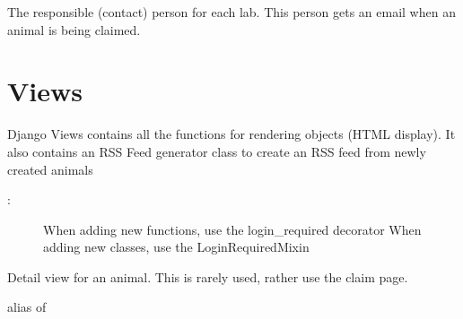 \documentclass[letterpaper,10pt,openany,oneside,english]{sphinxmanual}
\begin{document}
\begin{fulllineitems}
\label{\detokenize{index:animals.models.Person}}
The responsible (contact) person for each lab.
This person gets an email when an animal is being claimed.

\begin{fulllineitems}
\label{\detokenize{index:animals.models.Person.DoesNotExist}}
\end{fulllineitems}


\begin{fulllineitems}
\label{\detokenize{index:animals.models.Person.MultipleObjectsReturned}}
\end{fulllineitems}


\end{fulllineitems}



\section{Views}
\label{\detokenize{index:module-animals.views}}\label{\detokenize{index:views}}
Django Views contains all the functions for rendering objects (HTML display).
It also contains an RSS Feed generator class to create an RSS feed from newly created animals
\begin{description}
\item[{:}] \leavevmode
When adding new functions, use the login\_required decorator
When adding new classes, use the LoginRequiredMixin

\end{description}

\begin{fulllineitems}
\label{\detokenize{index:animals.views.AnimalDetailView}}
Detail view for an animal.
This is rarely used, rather use the claim page.

\begin{fulllineitems}
\label{\detokenize{index:animals.views.AnimalDetailView.model}}
alias of 

\end{fulllineitems}


\end{fulllineitems}
\end{document}
